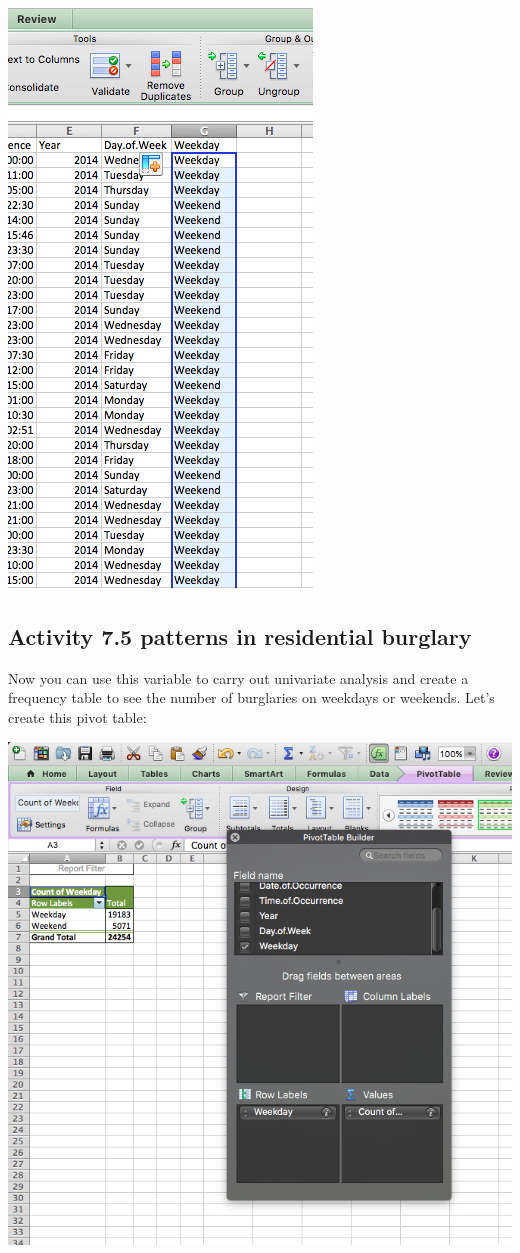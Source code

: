 \documentclass[
]{book}
\begin{document}
\includegraphics{imgs/wkday_var_created.png}

\hypertarget{activity-7.5-patterns-in-residential-burglary}{%
\subsection{Activity 7.5 patterns in residential burglary}\label{activity-7.5-patterns-in-residential-burglary}}

Now you can use this variable to carry out univariate analysis and create a frequency table to see the number of burglaries on weekdays or weekends. Let's create this pivot table:

\includegraphics{imgs/wkday_pivot.png}
\end{document}
